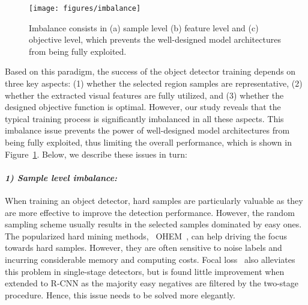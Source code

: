 \documentclass[10pt,twocolumn,letterpaper]{article}
\begin{document}
\begin{figure}
	\setlength{\belowcaptionskip}{-15pt}
	\centering
	\texttt{[image: figures/imbalance]}
	\caption{Imbalance consists in (a) sample level (b) feature level and (c) objective level,
	which prevents the well-designed model architectures from being fully exploited.}
	\label{fig:imbalance}
\end{figure}

Based on this paradigm, the success of the object detector training depends on
three key aspects:
(1) whether the selected region samples are representative,
(2) whether the extracted visual features are fully utilized, and
(3) whether the designed objective function is optimal.
However, our study reveals that the typical training process is significantly imbalanced in all these aspects.
This imbalance issue prevents the power of well-designed model architectures from being fully exploited,
thus limiting the overall performance, which is shown in Figure~\ref{fig:imbalance}.
Below, we describe these issues in turn:

\vspace{-15pt}
\paragraph{\emph{1) Sample level imbalance:}}
When training an object detector, hard samples are particularly valuable
as they are more effective to improve the detection performance.
However, the random sampling scheme usually results in
the selected samples dominated by easy ones.
The popularized hard mining methods, \eg~OHEM~\cite{ohem}, can help driving
the focus towards hard samples.
However, they are often sensitive to noise labels and incurring considerable memory and computing costs.
Focal loss~\cite{focalloss} also alleviates this problem in single-stage detectors,
but is found little improvement when extended to R-CNN as the majority easy negatives are filtered by the two-stage procedure.
Hence, this issue needs to be solved more elegantly.

\vspace{-15pt}
\end{document}
